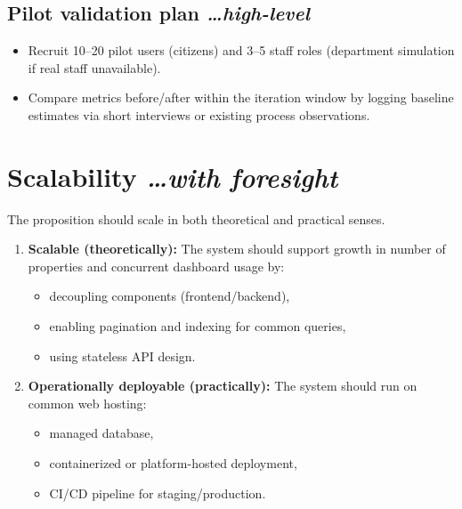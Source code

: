 \documentclass[11pt,a4paper]{article}
\newcommand{\BvrHint}[1]{%
  {\normalfont\normalsize\itshape\hfill #1}}
\begin{document}
\subsection{Pilot validation plan %
\BvrHint{\ldots high-level}}
\begin{itemize}[leftmargin=0.7cm]
    \item Recruit 10--20 pilot users (citizens) and 3--5 staff roles (department simulation if real staff unavailable).
    \item Compare metrics before/after within the iteration window by logging baseline estimates via short interviews or existing process observations.
\end{itemize}

\section{Scalability %
\BvrHint{\ldots with foresight}}
The proposition should scale in both theoretical and practical senses.

\begin{enumerate}[leftmargin=0.7cm]
    \item \textbf{Scalable (theoretically):} The system should support growth in number of properties and concurrent dashboard usage by:
    \begin{itemize}[leftmargin=0.7cm]
        \item decoupling components (frontend/backend),
        \item enabling pagination and indexing for common queries,
        \item using stateless API design.
    \end{itemize}
    
    \item \textbf{Operationally deployable (practically):} The system should run on common web hosting:
    \begin{itemize}[leftmargin=0.7cm]
        \item managed database,
        \item containerized or platform-hosted deployment,
        \item CI/CD pipeline for staging/production.
    \end{itemize}
\end{enumerate}
\end{document}
